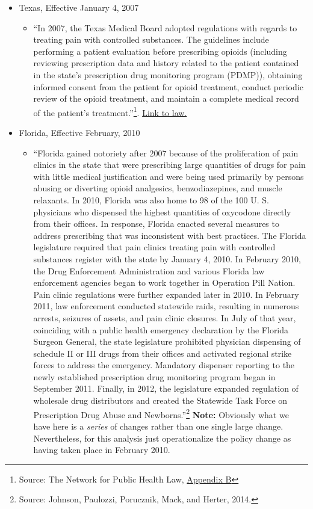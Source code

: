 \documentclass[12pt]{article}
\begin{document}
\begin{itemize}
  \item Texas, Effective January 4, 2007
  \begin{itemize}
    \item ``In 2007, the Texas Medical Board adopted regulations with regards to treating pain with
controlled substances. The guidelines include performing a patient evaluation before prescribing opioids (including reviewing
prescription data and history related to the patient contained in the state’s prescription drug monitoring program (PDMP)), obtaining informed consent from the patient for opioid treatment, conduct periodic review of the opioid treatment, and maintain a complete medical record of the patient’s treatment.''\footnote{Source: The Network for Public Health Law, \href{https://azdhs.gov/documents/prevention/womens-childrens-health/injury-prevention/opioid-prevention/appendix-b-state-by-state-summary.pdf}{Appendix B}}. \href{https://texreg.sos.state.tx.us/public/readtac$ext.TacPage?sl=R&app=9&p_dir=&p_rloc=&p_tloc=&p_ploc=&pg=1&p_tac=&ti=22&pt=9&ch=170&rl=3}{Link to law.}
  \end{itemize}
  \item Florida, Effective February, 2010
  \begin{itemize}
    \item ``Florida gained notoriety after 2007 because of the proliferation of pain clinics in the state that were prescribing large quantities of drugs for pain with little medical justification and were being used primarily by persons abusing or diverting opioid analgesics, benzodiazepines, and muscle relaxants. In 2010, Florida was also home to 98 of the 100 U. S. physicians who dispensed the highest quantities of oxycodone directly from their offices. In response, Florida enacted several measures to address prescribing that was inconsistent with best practices. The Florida legislature required that pain clinics treating pain with controlled substances register with the state by January 4, 2010. In February 2010, the Drug Enforcement Administration and various Florida law enforcement agencies began to work together in Operation Pill Nation. Pain clinic regulations were further expanded later in 2010. In February 2011, law enforcement conducted statewide raids, resulting in numerous arrests, seizures of assets, and pain clinic closures. In July of that year, coinciding with a public health emergency declaration by the Florida Surgeon General, the state legislature prohibited physician dispensing of schedule II or III drugs from their offices and activated regional strike forces to address the emergency. Mandatory dispenser reporting to the newly established prescription drug monitoring program began in September 2011. Finally, in 2012, the legislature expanded regulation of wholesale drug distributors and created the Statewide Task Force on Prescription Drug Abuse and Newborns.''\footnote{Source: Johnson, Paulozzi, Porucznik, Mack, and Herter, 2014.} \textbf{Note:} Obviously what we have here is a \emph{series} of changes rather than one single large change. Nevertheless, for this analysis just operationalize the policy change as having taken place in February 2010.

\end{itemize}
\end{itemize}
\end{document}

